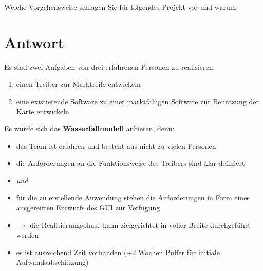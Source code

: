 Welche Vorgehensweise schlagen Sie für folgendes Projekt vor und warum:\\

\noindent
[...]

\section*{Antwort}
Es sind zwei Aufgaben von drei erfahrenen Personen zu realisieren:

\begin{enumerate}
    \item einen Treiber zur Marktreife entwickeln
    \item eine existierende Software zu einer marktfähigen Software zur Benutzung der Karte entwickeln
\end{enumerate}


\noindent
Es würde sich das \textbf{Wasserfallmodell} anbieten, denn:

\begin{itemize}
    \item das Team ist erfahren und besteht aus nicht zu vielen Personen
    \item die Anforderungen an die Funktionsweise des Treibers sind klar definiert
    \item[] \textit{und}
    \item für die zu erstellende Anwendung stehen die Anforderungen in Form eines ausgereiften Entwurfs des GUI zur Verfügung
    \item[] $\rightarrow$ die Realisierungsphase kann zielgerichtet in voller Breite durchgeführt werden
    \item es ist ausreichend Zeit vorhanden ($+2$ Wochen Puffer für initiale Aufwandsabschätzung)
\end{itemize}


